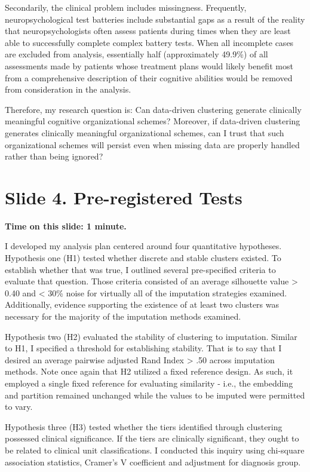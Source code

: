 \documentclass[
  11pt,
]{article}
\begin{document}
Secondarily, the clinical problem includes missingness. Frequently,
neuropsychological test batteries include substantial gaps as a result
of the reality that neuropsychologists often assess patients during
times when they are least able to successfully complete complex battery
tests. When all incomplete cases are excluded from analysis, essentially
half (approximately 49.9\%) of all assessments made by patients whose
treatment plans would likely benefit most from a comprehensive
description of their cognitive abilities would be removed from
consideration in the analysis.

Therefore, my research question is: Can data-driven clustering generate
clinically meaningful cognitive organizational schemes? Moreover, if
data-driven clustering generates clinically meaningful organizational
schemes, can I trust that such organizational schemes will persist even
when missing data are properly handled rather than being ignored?

\section{Slide 4. Pre-registered
Tests}\label{slide-4.-pre-registered-tests}

\textbf{Time on this slide: 1 minute.}

I developed my analysis plan centered around four quantitative
hypotheses. Hypothesis one (H1) tested whether discrete and stable
clusters existed. To establish whether that was true, I outlined several
pre-specified criteria to evaluate that question. Those criteria
consisted of an average silhouette value \textgreater{} 0.40 and
\textless{} 30\% noise for virtually all of the imputation strategies
examined. Additionally, evidence supporting the existence of at least
two clusters was necessary for the majority of the imputation methods
examined.

Hypothesis two (H2) evaluated the stability of clustering to imputation.
Similar to H1, I specified a threshold for establishing stability. That
is to say that I desired an average pairwise adjusted Rand Index
\textgreater{} .50 across imputation methods. Note once again that H2
utilized a fixed reference design. As such, it employed a single fixed
reference for evaluating similarity - i.e., the embedding and partition
remained unchanged while the values to be imputed were permitted to
vary.

Hypothesis three (H3) tested whether the tiers identified through
clustering possessed clinical significance. If the tiers are clinically
significant, they ought to be related to clinical unit classifications.
I conducted this inquiry using chi-square association statistics,
Cramer's V coefficient and adjustment for diagnosis group.
\end{document}
